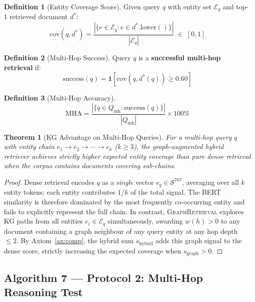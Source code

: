 \documentclass[12pt,a4paper]{article}
\theoremstyle{definition}
\newtheorem{definition}{Definition}[section]
\theoremstyle{plain}
\newtheorem{theorem}{Theorem}[section]
\theoremstyle{remark}
\begin{document}
\begin{definition}[Entity Coverage Score]
\label{def:coverage}
Given query $q$ with entity set $\mathcal{E}_q$ and top-1 retrieved
document $d^*$:
\[
  \mathrm{cov}(q, d^*) =
  \frac{|\{e \in \mathcal{E}_q : e \in d^*.\mathrm{lower}()\}|}
       {|\mathcal{E}_q|}
  \;\in\; [0, 1]
\]
\end{definition}

\begin{definition}[Multi-Hop Success]
\label{def:mhsuccess}
Query $q$ is a \textbf{successful multi-hop retrieval} if:
\[
  \mathrm{success}(q) = \mathbf{1}\!\left[
    \mathrm{cov}(q, d^*(q)) \geq 0.60
  \right]
\]
\end{definition}

\begin{definition}[Multi-Hop Accuracy]
\label{def:mha}
\[
  \mathrm{MHA} =
  \frac{|\{q \in Q_{\text{mh}} : \mathrm{success}(q)\}|}
       {|Q_{\text{mh}}|} \times 100\%
\]
\end{definition}

\begin{theorem}[KG Advantage on Multi-Hop Queries]
\label{thm:mh}
For a multi-hop query $q$ with entity chain
$e_1 \to e_2 \to \cdots \to e_k$ ($k \geq 3$), the graph-augmented
hybrid retriever achieves strictly higher expected entity coverage
than pure dense retrieval when the corpus contains documents
covering sub-chains.
\end{theorem}
\begin{proof}
Dense retrieval encodes $q$ as a \emph{single} vector $e_q \in \mathcal{S}^{767}$,
averaging over all $k$ entity tokens; each entity contributes $1/k$ of
the total signal.  The BERT similarity is therefore dominated by the
most frequently co-occurring entity and fails to explicitly represent
the full chain.  In contrast, \textsc{GraphRetrieval} explores KG paths
from all entities $e_i \in \mathcal{E}_q$ simultaneously, awarding
$w(h)>0$ to any document containing a graph neighbour of any query
entity at any hop depth $\leq 2$.  By Axiom~\ref{ax:comp}, the hybrid
sum $s_{\text{hybrid}}$ adds this graph signal to the dense score,
strictly increasing the expected coverage when $s_{\text{graph}} > 0$.
\end{proof}

\subsection{Algorithm 7 --- Protocol 2: Multi-Hop Reasoning Test}
\end{document}
